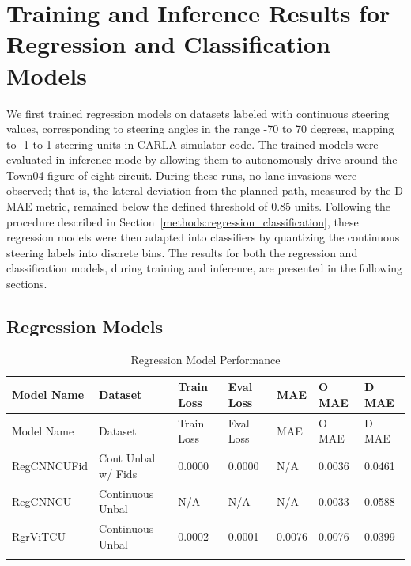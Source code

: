 
\section{Training and Inference Results for Regression and Classification Models}

We first trained regression models on datasets labeled with continuous steering values, corresponding to steering angles in the range -70 to 70 degrees, mapping to -1 to 1 steering units in CARLA simulator code. The trained models were evaluated in inference mode by allowing them to autonomously drive around the Town04 figure-of-eight circuit. During these runs, no lane invasions were observed; that is, the lateral deviation from the planned path, measured by the D MAE metric, remained below the defined threshold of 0.85 units. Following the procedure described in Section~\ref{methods:regression_classification}, these regression models were then adapted into classifiers by quantizing the continuous steering labels into discrete bins. The results for both the regression and classification models, during training and inference, are presented in the following sections.


\subsection{Regression Models}
\begin{longtable}{@{}lllllll@{}}
\toprule
Model Name & Dataset & Train Loss & Eval Loss & MAE & O MAE & D MAE \\
\midrule
\endfirsthead
\toprule
Model Name & Dataset & Train Loss & Eval Loss & MAE & O MAE & D MAE \\
\midrule
\endhead
RegCNNCUFid & Cont Unbal w/ Fids & 0.0000 & 0.0000 & N/A & 0.0036 & 0.0461 \\
RegCNNCU & Continuous Unbal & N/A & N/A & N/A & 0.0033 & 0.0588 \\
RgrViTCU & Continuous Unbal & 0.0002 & 0.0001 & 0.0076 & 0.0076 & 0.0399 \\
\bottomrule
\caption{Regression Model Performance}
\label{results:table_regression_models}
\end{longtable}

